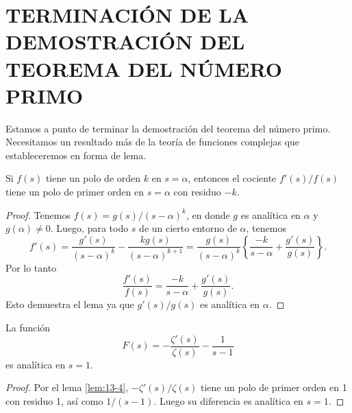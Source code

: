     \section{TERMINACIÓN DE LA DEMOSTRACIÓN DEL TEOREMA DEL NÚMERO PRIMO}

    Estamos a punto de terminar la demostración del teorema del número primo. Necesitamos un
    resultado más de la teoría de funciones complejas que estableceremos en forma de lema.

    \begin{lema}\label{lem:13-4}
        Si $f(s)$ tiene un polo de orden $k$ en $s=\alpha$, entonces el cociente $f'(s)/f(s)$
        tiene un polo de primer orden en $s=\alpha$ con residuo $-k$.
    \end{lema}

    \begin{proof}
        Tenemos $f(s)=g(s)/(s-\alpha)^k$, en donde $g$ es analítica en $\alpha$ y
        $g(\alpha)\neq0$. Luego, para todo $s$ de un cierto entorno de $\alpha$, tenemos
        \begin{equation*}
            f'(s)=\frac{g'(s)}{(s-\alpha)^k}-\frac{kg(s)}{(s-\alpha)^{k+1}}=\frac{g(s)}{(s-\alpha)^k}\left\{\frac{-k}{s-\alpha}+\frac{g'(s)}{g(s)}\right\}.
        \end{equation*}
        Por lo tanto
        \begin{equation*}
            \frac{f'(s)}{f(s)}=\frac{-k}{s-\alpha}+\frac{g'(s)}{g(s)}.
        \end{equation*}
        Esto demuestra el lema ya que $g'(s)/g(s)$ es analítica en $\alpha$.
    \end{proof}

    \begin{teorema}\label{teo:13-8}
        La función
        \begin{equation*}
            F(s)=-\frac{\zeta'(s)}{\zeta(s)}-\frac{1}{s-1}
        \end{equation*}
        es analítica en $s=1$.
    \end{teorema}

    \begin{proof}
        Por el lema \ref{lem:13-4}, $-\zeta'(s)/\zeta(s)$ tiene un polo de primer orden en 1 con
        residuo 1, así como $1/(s-1)$. Luego su diferencia es analítica en $s=1$.
    \end{proof}

